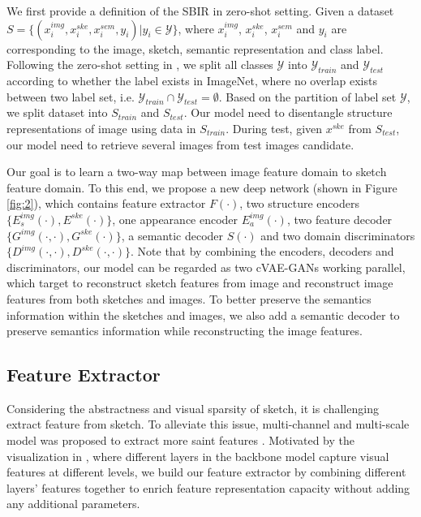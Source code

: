 \documentclass[10pt,twocolumn,letterpaper]{article}
\begin{document}
We first provide a definition of the SBIR in zero-shot setting. Given a dataset $S=\{(x_i^{img}, x_i^{ske}, x_i^{sem}, y_i)|y_i \in \mathcal{Y}\}$, where $x_i^{img}$, $x_i^{ske}$, $x_i^{sem}$ and $y_i$ are corresponding to the image, sketch, semantic representation and class label. Following the zero-shot setting in \cite{yelamarthi2018zero}, we split all classes $\mathcal{Y}$ into $\mathcal{Y}_{train}$ and $\mathcal{Y}_{test}$ according to whether the label exists in ImageNet\cite{deng2009imagenet}, where no overlap exists between two label set, i.e. $\mathcal{Y}_{train} \cap \mathcal{Y}_{test} = \emptyset$. Based on the partition of label set $\mathcal{Y}$, we split dataset into $S_{train}$ and $S_{test}$. Our model need to disentangle structure representations of image using data in $S_{train}$. During test, given $x^{ske}$ from $S_{test}$, our model need to retrieve several images from test images candidate.

Our goal is to learn a two-way map between image feature domain to sketch feature domain. To this end, we propose a new deep network (shown in Figure \ref{fig:2}), which contains feature extractor $F(\cdot)$, two structure encoders $\{E_{s}^{img}(\cdot), E^{ske}(\cdot)\}$, one appearance encoder $E^{img}_{a}(\cdot)$, two feature decoder $\{G^{img}(\cdot, \cdot), G^{ske}(\cdot)\}$, a semantic decoder $S(\cdot)$ and two domain discriminators $\{D^{img}(\cdot, \cdot), D^{ske}(\cdot, \cdot)\}$. Note that by combining the encoders, decoders and discriminators, our model can be regarded as two cVAE-GANs working parallel, which target to reconstruct sketch features from image and reconstruct image features from both sketches and images. To better preserve the semantics information within the sketches and images, we also add a semantic decoder to preserve semantics information while reconstructing the image features.


\subsection{Feature Extractor} \label{3.2}
Considering the abstractness and visual sparsity of sketch, it is challenging extract feature from sketch. To alleviate this issue, multi-channel and multi-scale model was proposed to extract more saint features \cite{yu2017sketch}. Motivated by the visualization in \cite{zeiler2014visualizing}, where different layers in the backbone model capture visual features at different levels, we build our feature extractor by combining different layers' features together to enrich feature representation capacity without adding any additional parameters.
\end{document}
